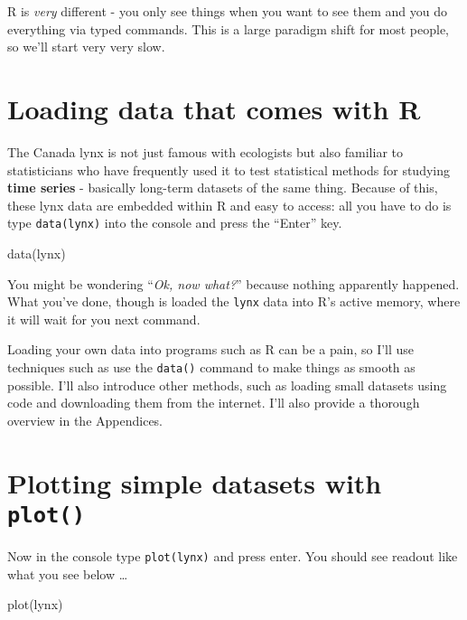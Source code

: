 \documentclass[
]{book}
\newenvironment{Shaded}{\begin{snugshade}}{\end{snugshade}}
\newcommand{\FunctionTok}[1]{\textcolor[rgb]{0.00,0.00,0.00}{#1}}
\newcommand{\NormalTok}[1]{#1}
\begin{document}
R is \emph{very} different - you only see things when you want to see them and you do everything via typed commands. This is a large paradigm shift for most people, so we'll start very very slow.

\hypertarget{loading-data-that-comes-with-r}{%
\section{Loading data that comes with R}\label{loading-data-that-comes-with-r}}

The Canada lynx is not just famous with ecologists but also familiar to statisticians who have frequently used it to test statistical methods for studying \textbf{time series} - basically long-term datasets of the same thing. Because of this, these lynx data are embedded within R and easy to access: all you have to do is type \texttt{data(lynx)} into the console and press the ``Enter'' key.

\begin{Shaded}
\begin{Highlighting}[]
\FunctionTok{data}\NormalTok{(lynx)}
\end{Highlighting}
\end{Shaded}

You might be wondering ``\emph{Ok, now what?}'' because nothing apparently happened. What you've done, though is loaded the \texttt{lynx} data into R's active memory, where it will wait for you next command.

Loading your own data into programs such as R can be a pain, so I'll use techniques such as use the \texttt{data()} command to make things as smooth as possible. I'll also introduce other methods, such as loading small datasets using code and downloading them from the internet. I'll also provide a thorough overview in the Appendices.

\hypertarget{plotting-simple-datasets-with-plot}{%
\section{\texorpdfstring{Plotting simple datasets with \texttt{plot()}}{Plotting simple datasets with plot()}}\label{plotting-simple-datasets-with-plot}}

Now in the console type \texttt{plot(lynx)} and press enter. You should see readout like what you see below \ldots{}

\begin{Shaded}
\begin{Highlighting}[]
\FunctionTok{plot}\NormalTok{(lynx)}
\end{Highlighting}
\end{Shaded}
\end{document}
